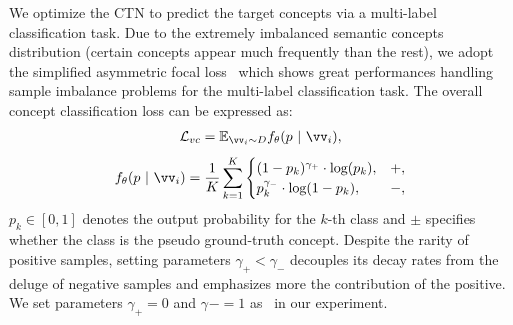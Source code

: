 We optimize the CTN to predict the target concepts via a multi-label classification task. Due to the extremely imbalanced semantic concepts distribution (certain concepts appear much frequently than the rest), we adopt the simplified asymmetric focal loss~\citep{ben2020asymmetric,liu2021query2label,lin2014microsoft} which shows great performances handling sample imbalance problems for the multi-label classification task. The overall concept classification loss can be expressed as: 
\begin{align}
\mathcal{L}_{{vc}} = \mathbb{E}_{\vv_i\sim D}f_{\theta}(p\ |\ \vv_i),
\end{align}
\begin{equation}
      f_{\theta}(p\ |\ \vv_i) = \frac{1}{K} \sum^{K}_{k=1}
\begin{cases}
    (1-p_{k})^{\gamma_{+}}\cdot\text{log}(p_k), & +, \\ p_{k}^{\gamma_{-}} \cdot \text{log}(1-p_k), & -,
\end{cases} 
\end{equation}
$p_k \in [0, 1]$ denotes the output probability for the $k$-th class and ${\pm}$ specifies whether the class is the pseudo ground-truth concept. Despite the rarity of positive samples, setting parameters $\gamma_{+} < \gamma_{-}$ decouples its decay rates from the deluge of negative samples and emphasizes more the contribution of the positive. We set parameters $\gamma_{+}=0$ and $\gamma_{}-=1$ as~\citep{liu2021query2label} in our experiment.

